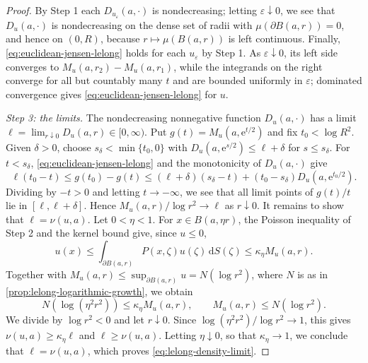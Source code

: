 \begin{proof}
By Step 1 each $D_{u_\varepsilon}(a,\cdot)$ is nondecreasing; letting $\varepsilon\downarrow0$, we see that $D_u(a,\cdot)$ is nondecreasing on the dense set of radii with $\mu(\partial B(a,r))=0$, and hence on $(0,R)$, because $r\mapsto\mu(B(a,r))$ is left continuous. Finally, \eqref{eq:euclidean-jensen-lelong} holds for each $u_\varepsilon$ by Step 1. As $\varepsilon\downarrow0$, its left side converges to $M_u(a,r_2)-M_u(a,r_1)$, while the integrands on the right converge for all but countably many $t$ and are bounded uniformly in $\varepsilon$; dominated convergence gives \eqref{eq:euclidean-jensen-lelong} for $u$.

\emph{Step 3: the limits.} The nondecreasing nonnegative function $D_u(a,\cdot)$ has a limit $\ell=\lim_{r\downarrow0}D_u(a,r)\in[0,\infty)$. Put $g(t)=M_u(a,\mathrm e^{t/2})$ and fix $t_0<\log R^2$. Given $\delta>0$, choose $s_\delta<\min\{t_0,0\}$ with $D_u(a,\mathrm e^{s/2})\leq\ell+\delta$ for $s\leq s_\delta$. For $t<s_\delta$, \eqref{eq:euclidean-jensen-lelong} and the monotonicity of $D_u(a,\cdot)$ give
\[
 \ell(t_0-t)\leq g(t_0)-g(t)\leq(\ell+\delta)(s_\delta-t)+(t_0-s_\delta)D_u(a,\mathrm e^{t_0/2}).
\]
Dividing by $-t>0$ and letting $t\to-\infty$, we see that all limit points of $g(t)/t$ lie in $[\ell,\ell+\delta]$. Hence $M_u(a,r)/\log r^2\to\ell$ as $r\downarrow0$. It remains to show that $\ell=\nu(u,a)$. Let $0<\eta<1$. For $x\in B(a,\eta r)$, the Poisson inequality of Step 2 and the kernel bound give, since $u\leq0$,
\[
 u(x)\leq\int_{\partial B(a,r)}P(x,\zeta)u(\zeta)\,\mathrm dS(\zeta)
 \leq\kappa_\eta M_u(a,r).
\]
Together with $M_u(a,r)\leq\sup_{\partial B(a,r)}u=N(\log r^2)$, where $N$ is as in \cref{prop:lelong-logarithmic-growth}, we obtain
\[
 N(\log(\eta^2r^2))\leq\kappa_\eta M_u(a,r),
 \qquad M_u(a,r)\leq N(\log r^2).
\]
We divide by $\log r^2<0$ and let $r\downarrow0$. Since $\log(\eta^2r^2)/\log r^2\to1$, this gives $\nu(u,a)\geq\kappa_\eta\ell$ and $\ell\geq\nu(u,a)$. Letting $\eta\downarrow0$, so that $\kappa_\eta\to1$, we conclude that $\ell=\nu(u,a)$, which proves \eqref{eq:lelong-density-limit}.
\end{proof}

